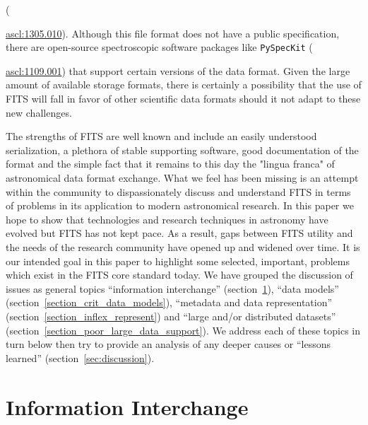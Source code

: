 \documentclass[final,authoryear,5p,times,twocolumn]{elsarticle}
\begin{document}
({\href{http://ascl.net/1305.010}{ascl:1305.010}). Although this file
format does not have a public specification,  there are open-source
spectroscopic software packages like \texttt{PySpecKit}
({\href{http://ascl.net/1109.001}{ascl:1109.001}) that support certain
versions of the data format.  Given the large amount of available
storage formats, there is certainly a possibility that the use of FITS
will fall in favor of other scientific data formats should it not adapt
to these new challenges.


The strengths of FITS are well known and include an easily understood
serialization, a plethora of stable supporting software, good documentation of
the format and the simple fact that it remains to this day the "lingua franca"
of astronomical data format exchange. What we feel has been missing is an 
attempt within the community to
dispassionately discuss and understand FITS in terms of problems in
its application to modern astronomical research. In this paper we hope to show 
that technologies and research techniques in astronomy have evolved but FITS has 
not kept pace. As a result, gaps between FITS utility and the needs of the 
research community have opened up and widened over time. 
It is our intended goal in this paper to highlight some selected, important, 
problems which exist in the FITS core standard today. 
We have grouped the discussion of issues as general topics ``information interchange''
(section~\ref{section_poor_exchange}), ``data models'' (section~\ref{section_crit_data_models}),
``metadata and data representation'' (section~\ref{section_inflex_represent}) and
``large and/or distributed datasets'' (section~\ref{section_poor_large_data_support}).
We address each of these topics in turn below then try to provide an
analysis of any deeper causes or ``lessons learned'' (section~\ref{sec:discussion}).



\section{Information Interchange}
\label{section_poor_exchange}

}}
\end{document}

